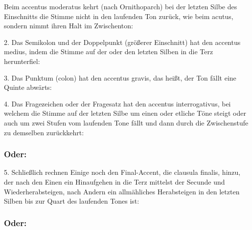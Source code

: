 Beim accentus moderatus kehrt (nach Ornithoparch) bei der letzten Silbe des Einschnitts die Stimme nicht in den laufenden Ton zurück, wie beim acutus, sondern nimmt ihren Halt im Zwischenton:


2. Das Semikolon und der Doppelpunkt (größerer Einschnitt) hat den accentus medius, indem die Stimme auf der oder den letzten Silben in die Terz herunterfiel:


3. Das Punktum (colon) hat den accentus gravis, das heißt, der Ton fällt eine Quinte abwärts:


4. Das Fragezeichen oder der Fragesatz hat den accentus interrogativus, bei welchem die Stimme auf der letzten Silbe um einen oder etliche Töne steigt oder auch um zwei Stufen vom laufenden Tone fällt und dann durch die Zwischenstufe zu demselben zurückkehrt:


\subsubsection{Oder:}


5. Schließlich rechnen Einige noch den Final-Accent, die clausula finalis, hinzu, der nach den Einen ein Hinaufgehen in die Terz mittelst der Secunde und Wiederherabsteigen, nach Andern ein allmähliches Herabsteigen in den letzten Silben bis zur Quart des laufenden Tones ist:


\subsubsection{Oder:}


